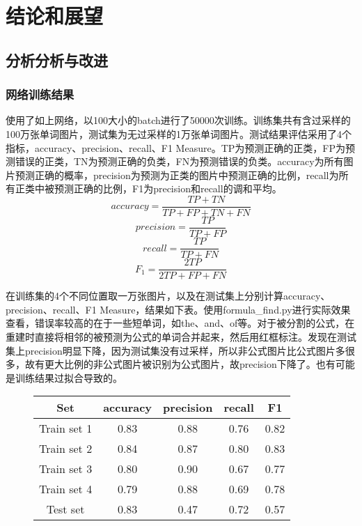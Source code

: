 
\chapter{结论和展望}

\section{分析分析与改进}

\subsection{网络训练结果}
\noindent

使用了如上网络，以100大小的batch进行了50000次训练。训练集共有含过采样的100万张单词图片，测试集为无过采样的1万张单词图片。测试结果评估采用了4个指标，accuracy、precision、recall、F1 Measure。TP为预测正确的正类，FP为预测错误的正类，TN为预测正确的负类，FN为预测错误的负类。accuracy为所有图片预测正确的概率，precision为预测为正类的图片中预测正确的比例，recall为所有正类中被预测正确的比例，F1为precision和recall的调和平均。
\[accuracy = \frac {TP + TN} {TP + FP + TN + FN}\]
\[precision = \frac {TP} {TP + FP}\]
\[recall = \frac {TP} {TP + FN}\]
\[F_1 = \frac {2 TP } {2 TP + FP + FN}\]



在训练集的4个不同位置取一万张图片，以及在测试集上分别计算accuracy、precision、recall、F1 Measure，结果如下表。使用formula\_find.py进行实际效果查看，错误率较高的在于一些短单词，如the、and、of等。对于被分割的公式，在重建时直接将相邻的被预测为公式的单词合并起来，然后用红框标注。发现在测试集上precision明显下降，因为测试集没有过采样，所以非公式图片比公式图片多很多，故有更大比例的非公式图片被识别为公式图片，故precision下降了。也有可能是训练结果过拟合导致的。

\begin{figure}[hp]
\centering
\begin{tabular}{ccccc}
\toprule
Set& accuracy& precision& recall& F1\\
\midrule
Train set 1& 0.83& 0.88& 0.76& 0.82\\
Train set 2& 0.84& 0.87& 0.80& 0.83\\
Train set 3& 0.80& 0.90& 0.67& 0.77\\
Train set 4& 0.79& 0.88& 0.69& 0.78\\
Test set& 0.83& 0.47& 0.72& 0.57\\
\bottomrule
\end{tabular}
\end{figure}

